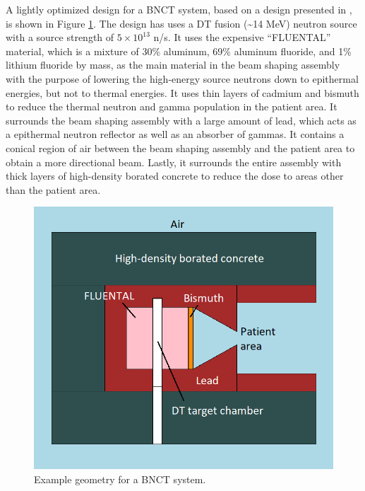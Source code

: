 A lightly optimized design for a BNCT system, based on a design presented in \cite{monshizadeh2015}, is shown in Figure \ref{fig:proposal:bnct_geom}.
The design has uses a DT fusion (\textasciitilde 14 MeV) neutron source with a source strength of $5\times 10^{13}$ n/s.
It uses the expensive ``FLUENTAL'' material, which is a mixture of 30\% aluminum, 69\% aluminum fluoride, and 1\% lithium fluoride by mass, as the main material in the beam shaping assembly with the purpose of lowering the high-energy source neutrons down to epithermal energies, but not to thermal energies.
It uses thin layers of cadmium and bismuth to reduce the thermal neutron and gamma population in the patient area.
It surrounds the beam shaping assembly with a large amount of lead, which acts as a epithermal neutron reflector as well as an absorber of gammas.
It contains a conical region of air between the beam shaping assembly and the patient area to obtain a more directional beam.
Lastly, it surrounds the entire assembly with thick layers of high-density borated concrete to reduce the dose to areas other than the patient area.
\begin{figure}[h!]
  \centering
  \includegraphics[width=0.75\linewidth]{content/proposal/BNCT_geom.png}
  \caption{Example geometry for a BNCT system.}
  \label{fig:proposal:bnct_geom}
\end{figure}

